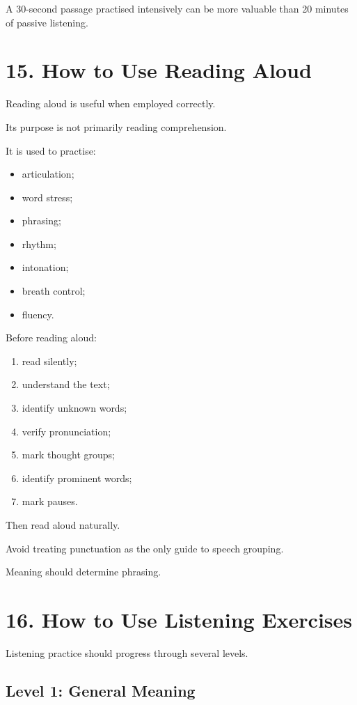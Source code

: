 A 30-second passage practised intensively can be more valuable than 20 minutes of passive listening.

\section*{15. How to Use Reading Aloud}

Reading aloud is useful when employed correctly.

Its purpose is not primarily reading comprehension.

It is used to practise:

\begin{itemize}
    \item articulation;
    \item word stress;
    \item phrasing;
    \item rhythm;
    \item intonation;
    \item breath control;
    \item fluency.
\end{itemize}

Before reading aloud:

\begin{enumerate}
    \item read silently;
    \item understand the text;
    \item identify unknown words;
    \item verify pronunciation;
    \item mark thought groups;
    \item identify prominent words;
    \item mark pauses.
\end{enumerate}

Then read aloud naturally.

Avoid treating punctuation as the only guide to speech grouping.

Meaning should determine phrasing.

\section*{16. How to Use Listening Exercises}

Listening practice should progress through several levels.

\subsection*{Level 1: General Meaning}

